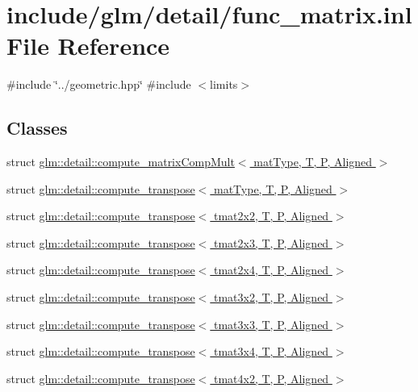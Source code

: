 \hypertarget{func__matrix_8inl}{}\section{include/glm/detail/func\+\_\+matrix.inl File Reference}
\label{func__matrix_8inl}
{\ttfamily \#include \char`\"{}../geometric.\+hpp\char`\"{}}\newline
{\ttfamily \#include $<$limits$>$}\newline
\subsection*{Classes}
\begin{DoxyCompactItemize}
\item 
struct \hyperlink{structglm_1_1detail_1_1compute__matrixCompMult}{glm\+::detail\+::compute\+\_\+matrix\+Comp\+Mult$<$ mat\+Type, T, P, Aligned $>$}
\item 
struct \hyperlink{structglm_1_1detail_1_1compute__transpose}{glm\+::detail\+::compute\+\_\+transpose$<$ mat\+Type, T, P, Aligned $>$}
\item 
struct \hyperlink{structglm_1_1detail_1_1compute__transpose_3_01tmat2x2_00_01T_00_01P_00_01Aligned_01_4}{glm\+::detail\+::compute\+\_\+transpose$<$ tmat2x2, T, P, Aligned $>$}
\item 
struct \hyperlink{structglm_1_1detail_1_1compute__transpose_3_01tmat2x3_00_01T_00_01P_00_01Aligned_01_4}{glm\+::detail\+::compute\+\_\+transpose$<$ tmat2x3, T, P, Aligned $>$}
\item 
struct \hyperlink{structglm_1_1detail_1_1compute__transpose_3_01tmat2x4_00_01T_00_01P_00_01Aligned_01_4}{glm\+::detail\+::compute\+\_\+transpose$<$ tmat2x4, T, P, Aligned $>$}
\item 
struct \hyperlink{structglm_1_1detail_1_1compute__transpose_3_01tmat3x2_00_01T_00_01P_00_01Aligned_01_4}{glm\+::detail\+::compute\+\_\+transpose$<$ tmat3x2, T, P, Aligned $>$}
\item 
struct \hyperlink{structglm_1_1detail_1_1compute__transpose_3_01tmat3x3_00_01T_00_01P_00_01Aligned_01_4}{glm\+::detail\+::compute\+\_\+transpose$<$ tmat3x3, T, P, Aligned $>$}
\item 
struct \hyperlink{structglm_1_1detail_1_1compute__transpose_3_01tmat3x4_00_01T_00_01P_00_01Aligned_01_4}{glm\+::detail\+::compute\+\_\+transpose$<$ tmat3x4, T, P, Aligned $>$}
\item 
struct \hyperlink{structglm_1_1detail_1_1compute__transpose_3_01tmat4x2_00_01T_00_01P_00_01Aligned_01_4}{glm\+::detail\+::compute\+\_\+transpose$<$ tmat4x2, T, P, Aligned $>$}

\end{DoxyCompactItemize}

